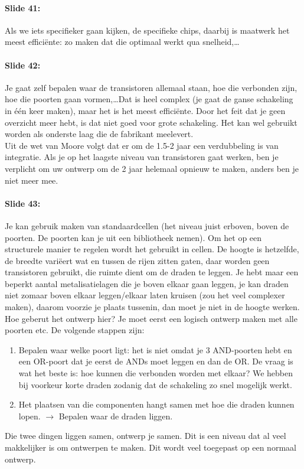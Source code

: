 \documentclass[10pt,a4paper]{book}
\begin{document}
\paragraph{Slide 41:} Als we iets specifieker gaan kijken, de specifieke chips, daarbij is maatwerk het meest effici\"ente: zo maken dat die optimaal werkt qua snelheid,\ldots

\paragraph{Slide 42:} Je gaat zelf bepalen waar de transistoren allemaal staan, hoe die verbonden zijn, hoe die poorten gaan vormen,\ldots Dat is heel complex (je gaat de ganse schakeling in \'e\'en keer maken), maar het is het meest effici\"ente. Door het feit dat je geen overzicht meer hebt, is dat niet goed voor grote schakeling. Het kan wel gebruikt worden als onderste laag die de fabrikant meelevert.\\
Uit de wet van Moore volgt dat  er om de 1.5-2 jaar een verdubbeling is van integratie. Als je op het laagste niveau van transistoren gaat werken, ben je verplicht om uw ontwerp om de 2 jaar helemaal opnieuw te maken, anders ben je niet meer mee.

\paragraph{Slide 43:} Je kan gebruik maken van standaardcellen (het niveau juist erboven, boven de poorten. De poorten kan je uit een bibliotheek nemen). Om het op een structurele manier te regelen wordt het gebruikt in cellen. De hoogte is hetzelfde, de breedte vari\"eert wat en tussen de rijen zitten gaten, daar worden geen transistoren gebruikt, die ruimte dient om de draden te leggen. Je hebt maar een beperkt aantal metalisatielagen die je boven elkaar gaan leggen, je kan draden niet zomaar boven elkaar leggen/elkaar laten kruisen (zou het veel complexer maken), daarom voorzie je plaats tussenin, dan moet je niet in de hoogte werken.\\
Hoe geberut het ontwerp hier? Je moet eerst een logisch ontwerp maken met alle poorten etc. De volgende stappen zijn:
\begin{enumerate}
\item Bepalen waar welke poort ligt: het is niet omdat je 3 AND-poorten hebt en een OR-poort dat je eerst de ANDs moet leggen en dan de OR. De vraag is wat het beste is: hoe kunnen die verbonden worden met elkaar? We hebben bij voorkeur korte draden zodanig dat de schakeling zo snel mogelijk werkt. 
\item Het plaatsen van die componenten hangt samen met hoe die draden kunnen lopen. $\rightarrow$ Bepalen waar de draden liggen.
\end{enumerate}
Die twee dingen liggen samen, ontwerp je samen. Dit is een niveau dat al veel makkelijker is om ontwerpen te maken. 
Dit wordt veel toegepast op een normaal ontwerp.
\end{document}
